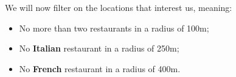 \documentclass[11pt]{article}
\makeatletter
\newcommand{\boxspacing}{\kern\kvtcb@left@rule\kern\kvtcb@boxsep}
\newcommand{\prompt}[4]{
        \ttfamily\llap{{\color{#2}[#3]:\hspace{3pt}#4}}\vspace{-\baselineskip}
    }
\makeatother
\begin{document}


        
    We will now filter on the locations that interest us, meaning:
\begin{itemize}
\item
    No more than two restaurants in a radius of 100m;
\item
    No \textbf{Italian} restaurant in a radius of 250m;
\item
    No \textbf{French} restaurant in a radius of 400m.
\end{itemize}
\end{document}
